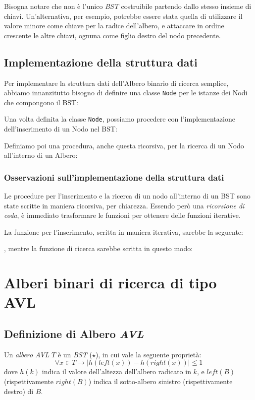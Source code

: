 \documentclass[11pt,a4paper,italian]{article}
\begin{document}
Bisogna notare che non è l'unico \textit{BST} costruibile partendo dallo stesso insieme di chiavi. Un'alternativa, per esempio, potrebbe essere stata quella di utilizzare il valore minore come chiave per la radice dell'albero, e attaccare in ordine crescente le altre chiavi, ognuna come figlio destro del nodo precedente.

\subsection{Implementazione della struttura dati}
Per implementare la struttura dati dell'Albero binario di ricerca semplice, abbiamo innanzitutto bisogno di definire una classe \texttt{Node} per le istanze dei Nodi che compongono il BST:
 

Una volta definita la classe \texttt{Node}, possiamo procedere con l'implementazione dell'inserimento di un Nodo nel BST:


Definiamo poi una procedura, anche questa ricorsiva, per la ricerca di un Nodo all'interno di un Albero:


\subsubsection{Osservazioni sull'implementazione della struttura dati}
Le procedure per l'inserimento e la ricerca di un nodo all'interno di un BST sono state scritte in maniera ricorsiva, per chiarezza. Essendo però una \textit{ricorsione di coda}, è immediato trasformare le funzioni per ottenere delle funzioni iterative.

La funzione per l'inserimento, scritta in maniera iterativa, sarebbe la seguente:

, mentre la funzione di ricerca sarebbe scritta in questo modo:



\clearpage

\section{Alberi binari di ricerca di tipo AVL}

\subsection{Definizione di Albero \textit{AVL}}  
Un \textit{albero AVL} $T$ è un \textit{BST} ($\star$), in cui vale la seguente proprietà:
\begin{equation}
	\forall x \in T \rightarrow | h(left(x)) - h(right(x)) | \leq 1	 \tag{$\ast$}
\end{equation}
dove $h(k)$ indica il valore dell'altezza dell'albero radicato in $k$, e $left(B)$ (rispettivamente $right(B)$) indica il sotto-albero sinistro (rispettivamente destro) di $B$.
\\
\end{document}
